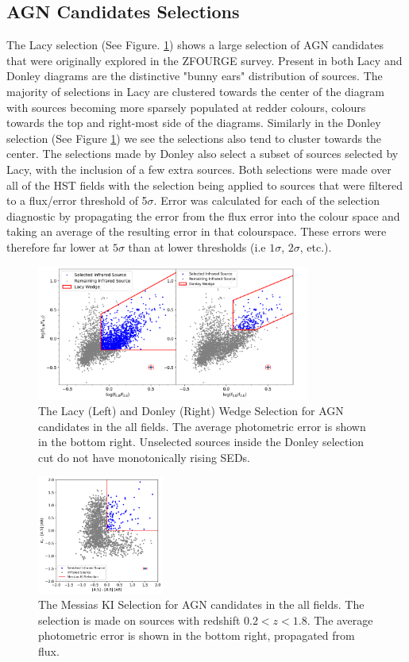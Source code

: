 \documentclass[11pt]{iopart}
\begin{document}
\subsection{AGN Candidates Selections}
The Lacy selection (See Figure. \ref{fig:DonleyLacyWedge}) shows a large selection of AGN candidates that were originally explored in the ZFOURGE survey. Present in both Lacy and Donley diagrams are the distinctive "bunny ears" distribution of sources\cite{sajina_simulating_2005}. The majority of selections in Lacy are clustered towards the center of the diagram with sources becoming more sparsely populated at redder colours, colours towards the top and right-most side of the diagrams. Similarly in the Donley selection (See Figure \ref{fig:DonleyLacyWedge}) we see the selections also tend to cluster towards the center. The selections made by Donley also select a subset of sources selected by Lacy, with the inclusion of a few extra sources. Both selections were made over all of the HST fields with the selection being applied to sources that were filtered to a flux/error threshold of 5$\sigma$. Error was calculated for each of the selection diagnostic by propagating the error from the flux error into the colour space and taking an average of the resulting error in that colourspace. These errors were therefore far lower at $5\sigma$ than at lower thresholds (i.e $1\sigma$, $2\sigma$, etc.). 
\begin{figure}
  \centering
  \includegraphics[width=0.8\textwidth]{plots/All_fieldsDonleyLacyWedge_error.png}
  \caption{The Lacy (Left) and Donley (Right) Wedge Selection for AGN candidates in the all fields. The average photometric error is shown in the bottom right. Unselected sources inside the Donley selection cut do not have monotonically rising SEDs.}
  \label{fig:DonleyLacyWedge}
\end{figure}
\begin{figure}
  \centering
  \includegraphics[width=0.37\textwidth]{plots/All_fieldsMessiasKISelection_error.png}
  \caption{The Messias KI Selection for AGN candidates in the all fields. The selection is made on sources with redshift $0.2 < z < 1.8$. The average photometric error is shown in the bottom right, propagated from flux.}
  \label{fig:MessiasKI}
\end{figure}
\end{document}
